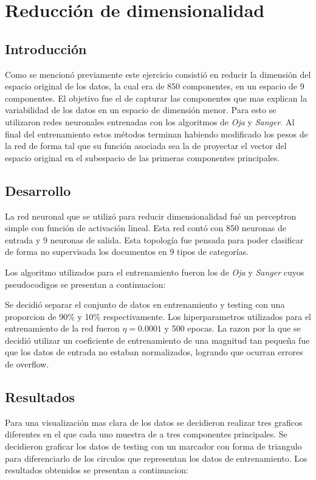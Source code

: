 \section{Reducción de dimensionalidad}

\subsection{Introducción}
Como se mencionó previamente este ejercicio consistió en reducir la dimensión del
espacio original de los datos, la cual era de 850 componentes,
en un espacio de 9 componentes. El objetivo fue el de capturar las componentes
que mas explican la variabilidad de los datos en un espacio de dimensión menor.
Para esto se utilizaron redes neuronales entrenadas con los algoritmos de
\textit{Oja} y \textit{Sanger}. Al final del entrenamiento estos métodos terminan
habiendo modificado los pesos de la red de forma tal que su función asociada sea la de
proyectar el vector del espacio original en el subespacio de las primeras
componentes principales.

\subsection{Desarrollo}
La red neuronal que se utilizó para reducir dimensionalidad fué un perceptron
simple con función de activación lineal. Esta red contó con 850 neuronas de
entrada y 9 neuronas de salida. Esta topología fue pensada para poder clasificar
de forma no supervisada los documentos en 9 tipos de categorías.

Los algoritmo utilizados para el entrenamiento fueron los de \textit{Oja} y
\textit{Sanger} cuyos pseudocodigos se presentan a continuacion:

Se decidió separar el conjunto de datos en entrenamiento y testing con una
proporcion de 90\% y 10\% respectivamente. Los hiperparametros utilizados para
el entrenamiento de la red fueron $\eta = 0.0001$ y 500 epocas. La razon por la
que se decidió utilizar un coeficiente de entrenamiento de una magnitud tan
pequeña fue que los datos de entrada no estaban normalizados, logrando que
ocurran errores de overflow.

\subsection{Resultados}
Para una visualización mas clara de los datos se decidieron realizar tres
graficos diferentes en el que cada uno muestra de a tres componentes
principales. Se decidieron graficar los datos de testing con un marcador con
forma de triangulo para diferenciarlo de los circulos que representan los datos
de entrenamiento. Los resultados obtenidos se presentan a continuacion:


